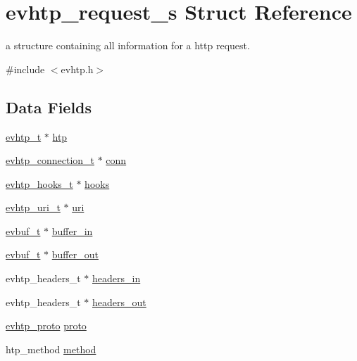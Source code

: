 \hypertarget{structevhtp__request__s}{
\section{evhtp\_\-request\_\-s Struct Reference}
\label{structevhtp__request__s}
}


a structure containing all information for a http request.  




{\ttfamily \#include $<$evhtp.h$>$}

\subsection*{Data Fields}
\begin{DoxyCompactItemize}
\item 
\hyperlink{structevhtp__s}{evhtp\_\-t} $\ast$ \hyperlink{structevhtp__request__s_ad2f5cc5c9e97f75f1fe923c57af9e875}{htp}
\item 
\hyperlink{structevhtp__connection__s}{evhtp\_\-connection\_\-t} $\ast$ \hyperlink{structevhtp__request__s_a313e4d80c47517f02f2fe99e8840c280}{conn}
\item 
\hyperlink{structevhtp__hooks__s}{evhtp\_\-hooks\_\-t} $\ast$ \hyperlink{structevhtp__request__s_ac97663394f74c9030e57c771cfb7981e}{hooks}
\item 
\hyperlink{structevhtp__uri__s}{evhtp\_\-uri\_\-t} $\ast$ \hyperlink{structevhtp__request__s_adfdac9f1ecf15761c62699a52d855a49}{uri}
\item 
\hyperlink{evhtp_8h_a7c30b85cd8bba6ebbfe58c3fc81139c8}{evbuf\_\-t} $\ast$ \hyperlink{structevhtp__request__s_ad9e8b203574b6c44296b23b897206768}{buffer\_\-in}
\item 
\hyperlink{evhtp_8h_a7c30b85cd8bba6ebbfe58c3fc81139c8}{evbuf\_\-t} $\ast$ \hyperlink{structevhtp__request__s_aa2a97cf41f1776b60c84e31eb6778d05}{buffer\_\-out}
\item 
evhtp\_\-headers\_\-t $\ast$ \hyperlink{structevhtp__request__s_a231fb5c9d95add6d73b4500233a98de8}{headers\_\-in}
\item 
evhtp\_\-headers\_\-t $\ast$ \hyperlink{structevhtp__request__s_a139e220680f914ac7a44f3dac1b34be0}{headers\_\-out}
\item 
\hyperlink{evhtp_8h_ac3df0cb2556f57ad0bc8bb44ae126da5}{evhtp\_\-proto} \hyperlink{structevhtp__request__s_a3acae974abf6e95063cab796fbe2a7f6}{proto}
\item 
htp\_\-method \hyperlink{structevhtp__request__s_a5322aefd6f774a31c7cbfaeee0d3a417}{method}

\end{DoxyCompactItemize}
